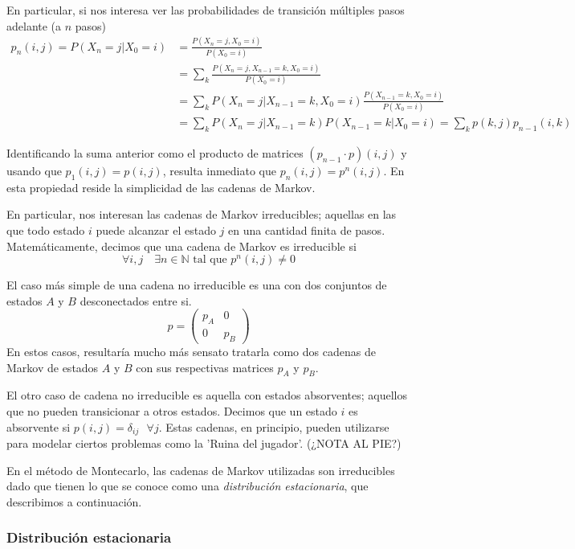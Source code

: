 En particular, si nos interesa ver las probabilidades de transición múltiples pasos adelante (a $n$ pasos)
\begin{align*}
 p_n(i,j) = P(X_n = j | X_0 = i) &= \frac{P(X_n = j, X_0 = i)}{P(X_0 = i)} \\
 &= \sum_k \frac{P(X_n = j, X_{n-1}=k, X_0 = i)}{P(X_0 = i)} \\
 &= \sum_k P(X_n = j| X_{n-1}=k, X_0 = i)\frac{P(X_{n-1}=k, X_0 = i)}{P(X_0 = i)} \\
 &= \sum_k P(X_n = j| X_{n-1}=k)P(X_{n-1}=k| X_0 = i) = \sum_k p(k,j)p_{n-1}(i,k)
\end{align*}

Identificando la suma anterior como el producto de matrices $(p_{n-1} \cdot p)(i,j)$ y usando que $p_1(i,j)=p(i,j)$, resulta inmediato que $p_n(i,j) = p^n(i,j)$. 
En esta propiedad reside la simplicidad de las cadenas de Markov.

En particular, nos interesan las cadenas de Markov irreducibles; aquellas en las que todo estado $i$ puede alcanzar el estado $j$ en una cantidad finita de pasos.
Matemáticamente, decimos que una cadena de Markov es irreducible si
\[ \forall i,j \quad \exists n\in \mathbb{N} \text{ tal que } p^n(i,j) \neq 0 \]

El caso más simple de una cadena no irreducible es una con dos conjuntos de estados $A$ y $B$ desconectados entre si.
\[ p = 
\begin{pmatrix}
 p_A & 0\\ 
 0 & p_B
\end{pmatrix} \]
En estos casos, resultaría mucho más sensato tratarla como dos cadenas de Markov de estados $A$ y $B$ con sus respectivas matrices $p_A$ y $p_B$.

El otro caso de cadena no irreducible es aquella con estados absorventes; aquellos que no pueden transicionar a otros estados.
Decimos que un estado $i$ es absorvente si $p(i,j)=\delta_{ij} \text{ } \forall j$.
Estas cadenas, en principio, pueden utilizarse para modelar ciertos problemas como la 'Ruina del jugador'. (¿NOTA AL PIE?)

En el método de Montecarlo, las cadenas de Markov utilizadas son irreducibles dado que tienen lo que se conoce como una \textit{distribución estacionaria}, que describimos a continuación.

\subsubsection{Distribución estacionaria}

